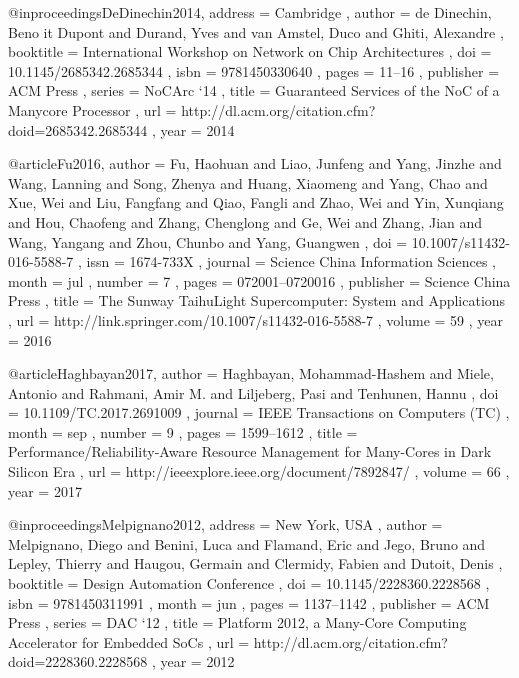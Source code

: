 @inproceedings{DeDinechin2014,
	address   = { Cambridge },
	author    = { de Dinechin, Beno{ \^{ i}}t Dupont and
		          Durand, Yves and
			      van Amstel, Duco and
				  Ghiti, Alexandre
	},
	booktitle = { International Workshop on Network on Chip Architectures },
	doi       = { 10.1145/2685342.2685344 },
	isbn      = { 9781450330640 },
	pages     = { 11--16 },
	publisher = { ACM Press },
	series    = { NoCArc `14 },
	title     = { Guaranteed Services of the NoC of a Manycore Processor },
	url       = { http://dl.acm.org/citation.cfm?doid=2685342.2685344 },
	year      = { 2014 }
}

@article{Fu2016,
	author    = { Fu, Haohuan and
		          Liao, Junfeng and
				  Yang, Jinzhe and
				  Wang, Lanning and
				  Song, Zhenya and
				  Huang, Xiaomeng and
				  Yang, Chao and
				  Xue, Wei and
				  Liu, Fangfang and
				  Qiao, Fangli and
				  Zhao, Wei and
				  Yin, Xunqiang and
				  Hou, Chaofeng and
				  Zhang, Chenglong and
				  Ge, Wei and
				  Zhang, Jian and
				  Wang, Yangang and
				  Zhou, Chunbo and
				  Yang, Guangwen
	},
	doi       = { 10.1007/s11432-016-5588-7 },
	issn      = { 1674-733X },
	journal   = { Science China Information Sciences },
	month     = { jul },
	number    = { 7 },
	pages     = { 072001--0720016 },
	publisher = { Science China Press },
	title     = { The Sunway TaihuLight Supercomputer: System and Applications },
	url       = { http://link.springer.com/10.1007/s11432-016-5588-7 },
	volume    = { 59 },
	year      = { 2016 }
}

@article{Haghbayan2017,
    author  = { Haghbayan, Mohammad-Hashem and
                Miele, Antonio and
                Rahmani, Amir M. and
                Liljeberg, Pasi and
                Tenhunen, Hannu
    },
    doi     = { 10.1109/TC.2017.2691009 },
    journal = { IEEE Transactions on Computers (TC) },
    month   = { sep },
    number  = { 9 },
    pages   = { 1599--1612 },
    title   = { Performance/Reliability-Aware Resource Management
                for Many-Cores in Dark Silicon Era
    },
    url     = { http://ieeexplore.ieee.org/document/7892847/ },
    volume  = { 66 },
    year    = { 2017 }
}

@inproceedings{Melpignano2012,
	address   = { New York, USA },
	author    = { Melpignano, Diego and
				  Benini, Luca and
			      Flamand, Eric and
				  Jego, Bruno and
				  Lepley, Thierry and
				  Haugou, Germain and
				  Clermidy, Fabien and
				  Dutoit, Denis
	},
	booktitle = { Design Automation Conference },
	doi       = { 10.1145/2228360.2228568 },
	isbn      = { 9781450311991 },
	month     = { jun },
	pages     = { 1137--1142 },
	publisher = { ACM Press },
	series    = { DAC `12 },
	title     = { Platform 2012, a Many-Core Computing Accelerator for Embedded SoCs },
	url       = { http://dl.acm.org/citation.cfm?doid=2228360.2228568 },
	year      = { 2012 }
}

